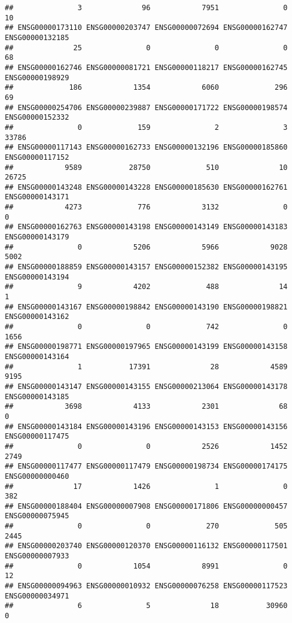 \documentclass[
]{article}
\begin{document}
\begin{verbatim}
##               3              96            7951               0              10 
## ENSG00000173110 ENSG00000203747 ENSG00000072694 ENSG00000162747 ENSG00000132185 
##              25               0               0               0              68 
## ENSG00000162746 ENSG00000081721 ENSG00000118217 ENSG00000162745 ENSG00000198929 
##             186            1354            6060             296              69 
## ENSG00000254706 ENSG00000239887 ENSG00000171722 ENSG00000198574 ENSG00000152332 
##               0             159               2               3           33786 
## ENSG00000117143 ENSG00000162733 ENSG00000132196 ENSG00000185860 ENSG00000117152 
##            9589           28750             510              10           26725 
## ENSG00000143248 ENSG00000143228 ENSG00000185630 ENSG00000162761 ENSG00000143171 
##            4273             776            3132               0               0 
## ENSG00000162763 ENSG00000143198 ENSG00000143149 ENSG00000143183 ENSG00000143179 
##               0            5206            5966            9028            5002 
## ENSG00000188859 ENSG00000143157 ENSG00000152382 ENSG00000143195 ENSG00000143194 
##               9            4202             488              14               1 
## ENSG00000143167 ENSG00000198842 ENSG00000143190 ENSG00000198821 ENSG00000143162 
##               0               0             742               0            1656 
## ENSG00000198771 ENSG00000197965 ENSG00000143199 ENSG00000143158 ENSG00000143164 
##               1           17391              28            4589            9195 
## ENSG00000143147 ENSG00000143155 ENSG00000213064 ENSG00000143178 ENSG00000143185 
##            3698            4133            2301              68               0 
## ENSG00000143184 ENSG00000143196 ENSG00000143153 ENSG00000143156 ENSG00000117475 
##               0               0            2526            1452            2749 
## ENSG00000117477 ENSG00000117479 ENSG00000198734 ENSG00000174175 ENSG00000000460 
##              17            1426               1               0             382 
## ENSG00000188404 ENSG00000007908 ENSG00000171806 ENSG00000000457 ENSG00000075945 
##               0               0             270             505            2445 
## ENSG00000203740 ENSG00000120370 ENSG00000116132 ENSG00000117501 ENSG00000007933 
##               0            1054            8991               0              12 
## ENSG00000094963 ENSG00000010932 ENSG00000076258 ENSG00000117523 ENSG00000034971 
##               6               5              18           30960               0 

\end{verbatim}
\end{document}
